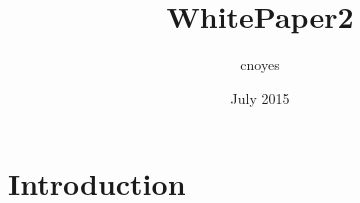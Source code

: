 \documentclass{article}
\title{WhitePaper2}
\author{cnoyes }
\date{July 2015}
\begin{document}
\maketitle

\section{Introduction}
\end{document}
